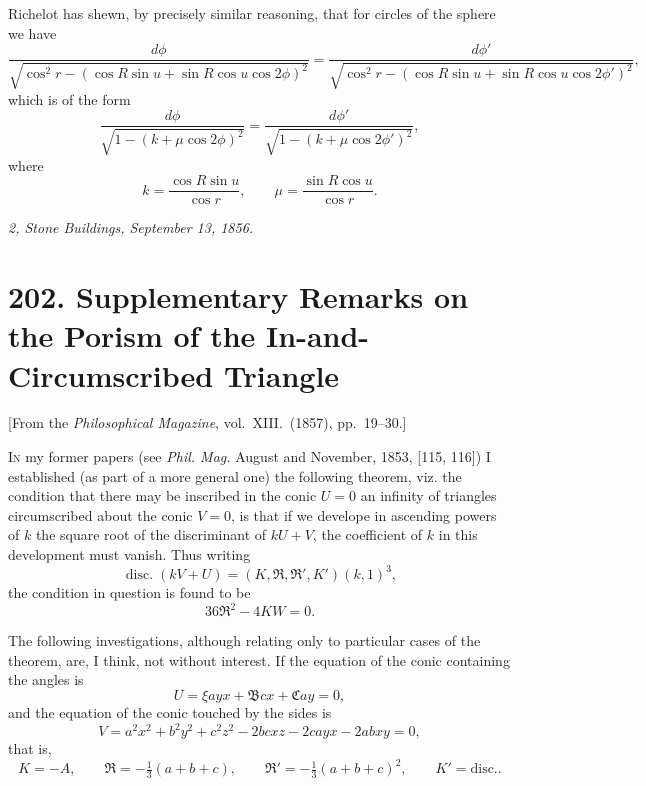 \documentclass[11pt,a4paper]{book}
\begin{document}
\smallskip

Richelot has shewn, by precisely similar reasoning, that for circles of the sphere
we have
\[
\frac{d\phi}{\sqrt{\cos^2 r - (\cos R \sin u + \sin R \cos u \cos 2\phi)^2}} = \frac{d\phi'}{\sqrt{\cos^2 r - (\cos R \sin u + \sin R \cos u \cos 2\phi')^2}},
\]
which is of the form
\[
\frac{d\phi}{\sqrt{1 - (k + \mu \cos 2\phi)^2}} = \frac{d\phi'}{\sqrt{1 - (k + \mu \cos 2\phi')^2}},
\]
where
\[
k = \frac{\cos R \sin u}{\cos r}, \qquad \mu = \frac{\sin R \cos u}{\cos r}.
\]

\bigskip

\noindent\textit{2, Stone Buildings, September 13, 1856.}

\newpage


\section*{202. Supplementary Remarks on the Porism of the In-and-Circumscribed Triangle}

\begin{center}
[From the \textit{Philosophical Magazine}, vol.~XIII.~(1857), pp.~19--30.]
\end{center}

\bigskip

I\textsc{n} my former papers (see \textit{Phil. Mag.} August and November, 1853, [115, 116]) I
established (as part of a more general one) the following theorem, viz. the condition
that there may be inscribed in the conic $U = 0$ an infinity of triangles circumscribed
about the conic $V = 0$, is that if we develope in ascending powers of $k$ the square root
of the discriminant of $kU + V$, the coefficient of $k$ in this development must vanish.
Thus writing
\[
\operatorname{disc.}(kV + U) = (K, \mathfrak{R}, \mathfrak{R}', K')(k, 1)^3,
\]
the condition in question is found to be
\[
36\mathfrak{R}^2 - 4KW = 0.
\]

The following investigations, although relating only to particular cases of the
theorem, are, I think, not without interest. If the equation of the conic containing
the angles is
\[
U = \xi a y x + \mathfrak{B} c x + \mathfrak{C} a y = 0,
\]
and the equation of the conic touched by the sides is
\[
V = a^2 x^2 + b^2 y^2 + c^2 z^2 - 2bc x z - 2ca y x - 2ab x y = 0,
\]
that is,
\[
K = -A,\qquad \mathfrak{R} = -\tfrac{1}{3}(a + b + c),\qquad \mathfrak{R}' = -\tfrac{1}{3}(a + b + c)^2,\qquad K' = \text{disc.}.
\]
\end{document}
